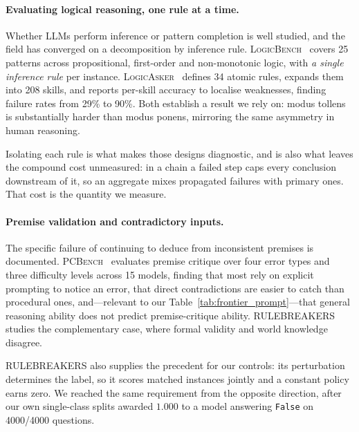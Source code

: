 \documentclass{article}
\begin{document}
\paragraph{Evaluating logical reasoning, one rule at a time.}
Whether LLMs perform inference or pattern completion is well studied, and the
field has converged on a decomposition by inference rule.
\textsc{LogicBench}~\citep{parmar2024logicbench} covers 25 patterns across
propositional, first-order and non-monotonic logic, with \emph{a single
inference rule} per instance. \textsc{LogicAsker}~\citep{wan2024logicasker}
defines 34 atomic rules, expands them into 208 skills, and reports per-skill
accuracy to localise weaknesses, finding failure rates from 29\% to 90\%.
Both establish a result we rely on: modus tollens is substantially harder than
modus ponens, mirroring the same asymmetry in human reasoning.

Isolating each rule is what makes those designs diagnostic, and is also what
leaves the compound cost unmeasured: in a chain a failed step caps every
conclusion downstream of it, so an aggregate mixes propagated failures with
primary ones. That cost is the quantity we measure.

\paragraph{Premise validation and contradictory inputs.}
The specific failure of continuing to deduce from inconsistent premises is
documented. \textsc{PCBench}~\citep{premiseCritique2025} evaluates premise
critique over four error types and three difficulty levels across 15 models,
finding that most rely on explicit prompting to notice an error, that direct
contradictions are easier to catch than procedural ones, and---relevant to our
Table~\ref{tab:frontier_prompt}---that general reasoning ability does not
predict premise-critique ability.
\textsc{RULEBREAKERS}~\citep{chan2025rulebreakers} studies the complementary
case, where formal validity and world knowledge disagree.

\textsc{RULEBREAKERS} also supplies the precedent for our controls: its
perturbation determines the label, so it scores matched instances jointly and a
constant policy earns zero. We reached the same requirement from the opposite
direction, after our own single-class splits awarded $1.000$ to a model
answering \texttt{False} on 4000/4000 questions.
\end{document}
